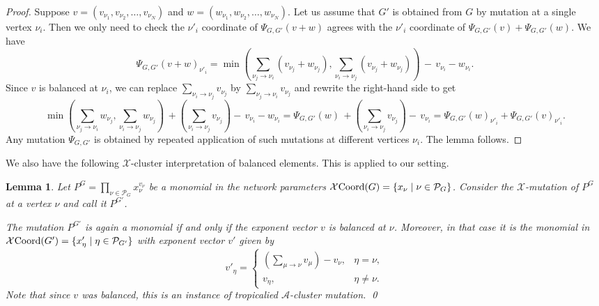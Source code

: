 \documentclass{amsart}
\newtheorem{lemma}[thm]{Lemma}
\theoremstyle{definition}
\numberwithin{equation}{section}
\renewcommand{\min}{{\operatorname{min}}}
\newcommand{\TB}{{\mathcal X\hskip -.05cm\operatorname{Coord}}}
\begin{document}
\begin{proof} Suppose $v=(v_{\nu_1},v_{\nu_2}, \dots,v_{\nu_N})$ and $w=(w_{\nu_1},w_{\nu_2}, \dots,w_{\nu_N})$. Let us assume that $G'$ is obtained from $G$ by mutation at a single vertex $\nu_i$. Then we only need to check the $\nu'_i$ coordinate of $\Psi_{G,G'}(v+w)$ agrees with the $\nu'_i$ coordinate of $\Psi_{G,G'}(v)+\Psi_{G,G'}(w)$. We have
\[
\Psi_{G,G'}(v+w)_{\nu'_i}=\min\left(\sum_{\nu_j \to \nu_i} (v_{\nu_j}+w_{\nu_j}), \sum_{\nu_i \to \nu_j} (v_{\nu_j}+w_{\nu_j})\right)\, - \, v_{\nu_i} - w_{\nu_i}.
\]
Since $v$ is balanced at $\nu_i$, we can replace  $\sum_{\nu_i \to \nu_j} v_{\nu_j}$ by $\sum_{\nu_j \to \nu_i} v_{\nu_j}$ and rewrite the right-hand side to get 
\[
\min(\sum_{\nu_j \to \nu_i}w_{\nu_j}, \sum_{\nu_i \to \nu_j} w_{\nu_j})\, +(\sum_{\nu_i \to \nu_j} v_{\nu_j}) - \, v_{\nu_i} - w_{\nu_i}=\Psi_{G,G'}(w)\, +(\sum_{\nu_i \to \nu_j} v_{\nu_j}) - \, v_{\nu_i}=\Psi_{G,G'}(w)_{\nu'_i}+\Psi_{G,G'}(v)_{\nu'_i}.
\]
Any mutation $\Psi_{G,G'}$ is obtained by repeated application of such mutations at different vertices $\nu_i$. The lemma follows.  
\end{proof}

We also have the following $\mathcal X$-cluster interpretation of balanced elements. This is \cite[Proposition~15.9]{RW} applied to our setting.

\begin{lemma}\label{l:monomialXmutation}
Let $P^G=\prod_{\nu\in\mathcal P_G} x_{\nu}^{v_{\nu}}$ 
	be a monomial in the network parameters $\TB(G)=\{x_{\nu}\mid\nu\in\mathcal P_G\}$. Consider the $\mathcal X$-mutation of $P^G$ at a vertex $\nu$ and call it $P^{G'}$. 

The mutation $P^{G'}$ is again a monomial if and only if the exponent vector $v$ is balanced at $\nu$. Moreover, in that case it is the monomial in $\TB(G')=\{x'_{\eta}\mid\eta\in\mathcal P_{G'}\}$ with exponent vector $v'$ given by 
\begin{equation}\label{e:balancedMutation}
v'_\eta=
\begin{cases} 
(\sum_{\mu \to \nu} v_\mu) - v_\nu, & \eta=\nu,\\
v_\eta, & \eta \ne \nu.
\end{cases}
\end{equation}
Note that since $v$ was balanced, this is an instance of tropicalied $\mathcal{A}$-cluster mutation. \qed
\end{lemma}
\end{document}
